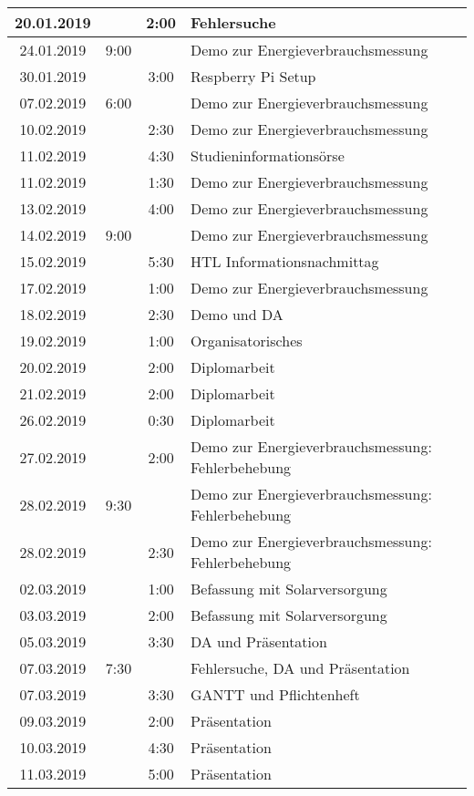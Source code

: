 \begin{longtable}[l]{|c|c|c|p{10cm}|}
20.01.2019  & & 2:00 &  Fehlersuche\\\hline
24.01.2019  & 9:00 & &  Demo zur Energieverbrauchsmessung\\\hline
30.01.2019  & & 3:00 &  Respberry Pi Setup\\\hline
07.02.2019  & 6:00 & &  Demo zur Energieverbrauchsmessung\\\hline
10.02.2019  & & 2:30 &  Demo zur Energieverbrauchsmessung\\\hline
11.02.2019  & & 4:30 &  Studieninformationsörse\\\hline
11.02.2019  & & 1:30 &  Demo zur Energieverbrauchsmessung\\\hline
13.02.2019  & & 4:00 &  Demo zur Energieverbrauchsmessung\\\hline
14.02.2019  & 9:00 & &  Demo zur Energieverbrauchsmessung\\\hline
15.02.2019  & & 5:30 &  HTL Informationsnachmittag\\\hline
17.02.2019  & & 1:00 &  Demo zur Energieverbrauchsmessung\\\hline
18.02.2019  & & 2:30 &  Demo und DA\\\hline
19.02.2019  & & 1:00 &  Organisatorisches\\\hline
20.02.2019  & & 2:00 &  Diplomarbeit\\\hline
21.02.2019  & & 2:00 &  Diplomarbeit\\\hline
26.02.2019  & & 0:30 &  Diplomarbeit\\\hline
27.02.2019  & & 2:00 &  Demo zur Energieverbrauchsmessung: Fehlerbehebung\\\hline
28.02.2019  & 9:30 & &  Demo zur Energieverbrauchsmessung: Fehlerbehebung\\\hline
28.02.2019  & & 2:30 &  Demo zur Energieverbrauchsmessung: Fehlerbehebung\\\hline
02.03.2019  & & 1:00 &  Befassung mit Solarversorgung\\\hline
03.03.2019  & & 2:00 &  Befassung mit Solarversorgung\\\hline
05.03.2019  & & 3:30 &  DA und Präsentation\\\hline
07.03.2019  & 7:30 & &  Fehlersuche, DA und Präsentation\\\hline
07.03.2019  & & 3:30 &  GANTT und Pflichtenheft\\\hline
09.03.2019  & & 2:00 &  Präsentation\\\hline
10.03.2019  & & 4:30 &  Präsentation\\\hline
11.03.2019  & & 5:00 &  Präsentation\\\hline

\end{longtable}
